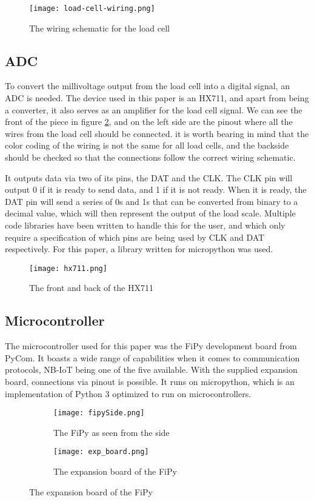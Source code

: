 \begin{figure}[h]
	\centering
	\texttt{[image: load-cell-wiring.png]}
	\caption{The wiring schematic for the load cell}
	\label{fig:wiring}
\end{figure}


\subsection{ADC}
To convert the millivoltage output from the load cell into a digital signal, an ADC is needed. The device used in this paper is an HX711, and apart from being a converter, it also serves as an amplifier for the load cell signal. We can see the front of the piece in figure \ref{fig:hx711}, and on the left side are the pinout where all the wires from the load cell should be connected. it is worth bearing in mind that the color coding of the wiring is not the same for all load cells, and the backside should be checked so that the connections follow the correct wiring schematic. 

It outputs data via two of its pins, the DAT and the CLK. The CLK pin will output 0 if it is ready to send data, and 1 if it is not ready. When it is ready, the DAT pin will send  a series of 0s and 1s that can be converted from binary to a decimal value, which will then represent the output of the load scale.\cite{hx711-datasheet} Multiple code libraries have been written to handle this for the user, and which only require a specification of which pins are being used by CLK and DAT respectively. For this paper, a library written for micropython was used.\cite{hx711-lopy}

\begin{figure}[h]
	\centering
	\texttt{[image: hx711.png]}
	\caption{The front and back of the HX711}
	\label{fig:hx711}
\end{figure}

\subsection{Microcontroller}
The microcontroller used for this paper was the FiPy development board from PyCom. It boasts a wide range of capabilities when it comes to communication protocols, NB-IoT being one of the five available.\cite{fipy-docs} With the supplied expansion board, connections via pinout is possible. It runs on micropython, which is an implementation of Python 3 optimized to run on microcontrollers.\cite{micropython}
\begin{figure}[H]
\centering
	\begin{subfigure}[b]{0.3\textwidth}
    \texttt{[image: fipySide.png]}
    \caption{The FiPy as seen from the side}
    \label{fig:fipySide}
	\end{subfigure}
	\begin{subfigure}[b]{0.3\textwidth}
    \texttt{[image: exp\_board.png]}
    \caption{The expansion board of the FiPy}
    \label{fig:exp_board}
	\end{subfigure}
\end{figure}

